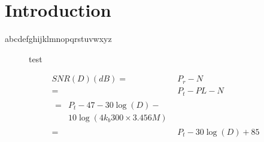 \chapter{Introduction} %
\label{cha:introduction}
  

abcdefghijklmnopqrstuvwxyz

\begin{figure}[htbp]
	\begin{center}
		\caption{test}
		\label{fig:test}
	\end{center}
\end{figure}


\begin{align}
SNR(D)(dB) =&  P_r - N \\
=& P_t - PL -N\\
\begin{split}
	= & P_t - 47 -30\log(D) - \\
	 & 10\log\left(4k_{b}300\times3.456M\right)	
\end{split} \\
=& P_t - 30\log(D) +85
\label{eq:SNR-pathloss}
\end{align}

